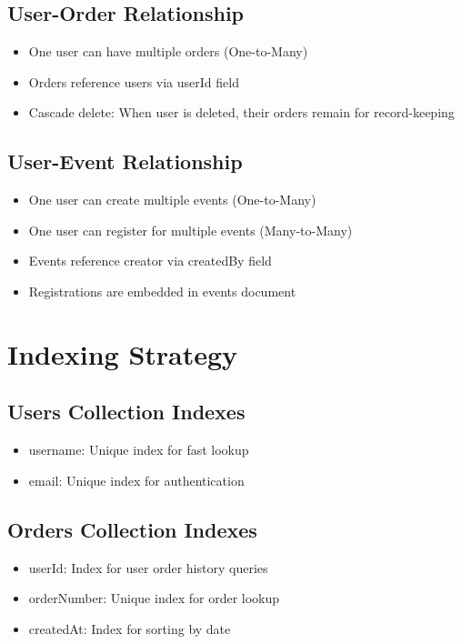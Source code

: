 \documentclass{scrreprt}
\begin{document}
\subsection{User-Order Relationship}
\begin{itemize}
\item One user can have multiple orders (One-to-Many)
\item Orders reference users via userId field
\item Cascade delete: When user is deleted, their orders remain for record-keeping
\end{itemize}

\subsection{User-Event Relationship}
\begin{itemize}
\item One user can create multiple events (One-to-Many)
\item One user can register for multiple events (Many-to-Many)
\item Events reference creator via createdBy field
\item Registrations are embedded in events document
\end{itemize}

\section{Indexing Strategy}

\subsection{Users Collection Indexes}
\begin{itemize}
\item username: Unique index for fast lookup
\item email: Unique index for authentication
\end{itemize}

\subsection{Orders Collection Indexes}
\begin{itemize}
\item userId: Index for user order history queries
\item orderNumber: Unique index for order lookup
\item createdAt: Index for sorting by date
\end{itemize}
\end{document}
